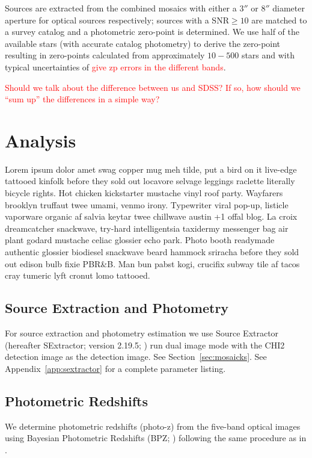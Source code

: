 \documentclass[apj, revtex4-1]{emulateapj}
\newcommand{\editorial}[1]{\textcolor{red}{#1}}
\begin{document}
Sources are extracted from the combined mosaics with either a $3''$ or $8''$ diameter aperture for optical sources respectively; sources with a SNR$\ge10$ are matched to a survey catalog and a photometric zero-point is determined. We use half of the available stars (with accurate catalog photometry) to derive the zero-point resulting in zero-points calculated from approximately $10-500$ stars and with typical uncertainties of \editorial{give zp errors in the different bands}.

\editorial{Should we talk about the difference between us and SDSS? If so, how should we ``sum up'' the differences in a simple way?}

\section{Analysis}\label{sec:analysis}
Lorem ipsum dolor amet swag copper mug meh tilde, put a bird on it live-edge tattooed kinfolk before they sold out locavore selvage leggings raclette literally bicycle rights. Hot chicken kickstarter mustache vinyl roof party. Wayfarers brooklyn truffaut twee umami, venmo irony. Typewriter viral pop-up, listicle vaporware organic af salvia keytar twee chillwave austin +1 offal blog. La croix dreamcatcher snackwave, try-hard intelligentsia taxidermy messenger bag air plant godard mustache celiac glossier echo park. Photo booth readymade authentic glossier biodiesel snackwave beard hammock sriracha before they sold out edison bulb fixie PBR\&B. Man bun pabst kogi, crucifix subway tile af tacos cray tumeric lyft cronut lomo tattooed.

\subsection{Source Extraction and Photometry}
For source extraction and photometry estimation we use Source Extractor (hereafter SExtractor; version 2.19.5; \citealt{Bertin1996}) run dual image mode with the CHI2 detection image as the detection image. See Section~\ref{sec:mosaicks}. See Appendix~\ref{app:sextractor} for a complete parameter listing.

\subsection{Photometric Redshifts}
We determine photometric redshifts (photo-z) from the five-band optical images using Bayesian Photometric Redshifts (BPZ; \citealt{Benitez2000, Coe2006}) following the same procedure as in \cite{Menanteau2009a}.
\end{document}
